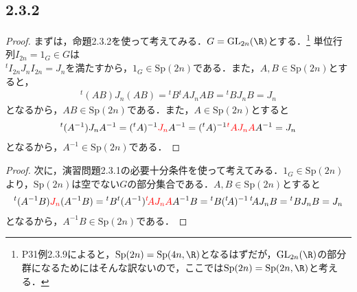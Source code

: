 \documentclass[uplatex,dvipdfmx,a4paper,11pt]{jsarticle}
\newenvironment{tleftbar}{\begin{tbleftline}\setlength{\parindent}{1zw}}{\end{tbleftline}}
\begin{document}
\subsection*{2.3.2}
\begin{tleftbar}
    \begin{proof}
        まずは，命題2.3.2を使って考えてみる．$G=\mathrm{GL}_{2n}(\R)$とする．\footnote{P31例2.3.9によると，$\mathrm{Sp}(2n)=\mathrm{Sp}(4n,\R)$となるはずだが，$\mathrm{GL}_{2n}(\R)$の部分群になるためにはそんな訳ないので，ここでは$\mathrm{Sp}(2n)=\mathrm{Sp}(2n,\R)$と考える．}
        単位行列$I_{2n}=1_G\in G$は\\
        ${}^tI_{2n}J_nI_{2n}=J_n$を満たすから，$1_G \in \mathrm{Sp}(2n)$である．また，$A,B\in \mathrm{Sp}(2n)$とすると，
        \begin{align*}
            ^t(AB)J_n(AB)={}^tB{}^tAJ_nAB ={}^tBJ_nB=J_n
        \end{align*}
        となるから，$AB\in \mathrm{Sp}(2n)$である．また，$A\in \mathrm{Sp}(2n)$とすると
        \begin{align*}
            ^t(A^{-1})J_nA^{-1}=({}^tA)^{-1}\textcolor{red}{J_n}A^{-1}=({}^tA)^{-1}\textcolor{red}{{}^tAJ_nA}A^{-1}=J_n
        \end{align*}
        となるから，$A^{-1}\in \mathrm{Sp}(2n)$である．
    \end{proof}
    \begin{proof}
        次に，演習問題2.3.1の必要十分条件を使って考えてみる．$1_G \in \mathrm{Sp}(2n)$より，$\mathrm{Sp}(2n)$は空でない$G$の部分集合である．$A,B\in \mathrm{Sp}(2n)$とすると
        \begin{align*}
            {}^t(A^{-1}B)\textcolor{red}{J_n}(A^{-1}B)={}^tB {}^t(A^{-1})\textcolor{red}{{}^t\!AJ_nA}A^{-1}B={}^tB ({}^t\!A)^{-1}\,{}^t\!A J_n B ={}^t BJ_nB=J_n
        \end{align*}
        となるから，$A^{-1}B\in \mathrm{Sp}(2n)$である．
    \end{proof}
\end{tleftbar}
\end{document}

